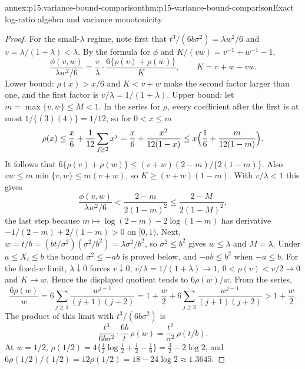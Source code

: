 \begin{annexitem}{annex:p15.variance-bound-comparison}{thm:p15-variance-bound-comparison}{Exact log-ratio algebra and variance monotonicity}
\begin{proof}
For the small-\(\lambda\) regime, note first that
\(t^3/(6b\sigma^2)=\lambda w^2/6\) and \(v=\lambda/(1+\lambda)<\lambda\).
By the formula for \(\phi\) and \(K/(vw)=v^{-1}+w^{-1}-1\),
\[
 \frac{\phi(v,w)}{\lambda w^2/6}
 =\frac v\lambda\cdot\frac{6\{\rho(v)+\rho(w)\}}{K},\qquad
 K=v+w-vw .
\]
Lower bound: \(\rho(x)>x/6\) and \(K<v+w\) make the second factor
larger than one, and the first factor is \(v/\lambda=1/(1+\lambda)\).
Upper bound: let \(m=\max\{v,w\}\leq M<1\). In the series for
\(\rho\), every coefficient after the first is at most
\(1/\{(3)(4)\}=1/12\), so for \(0<x\leq m\)
\[
 \rho(x)\leq\frac x6+\frac1{12}\sum_{j\geq2}x^j
 =\frac x6+\frac{x^2}{12(1-x)}
 \leq x\Bigl(\frac16+\frac m{12(1-m)}\Bigr).
\]
It follows that
\(6\{\rho(v)+\rho(w)\}\leq(v+w)(2-m)/\{2(1-m)\}\). Also
\(vw\leq m\min\{v,w\}\leq m(v+w)\), so \(K\geq(v+w)(1-m)\). With
\(v/\lambda<1\) this gives
\[
 \frac{\phi(v,w)}{\lambda w^2/6}<\frac{2-m}{2(1-m)^2}
 \leq\frac{2-M}{2(1-M)^2},
\]
the last step because \(m\mapsto\log(2-m)-2\log(1-m)\) has derivative
\(-1/(2-m)+2/(1-m)>0\) on \([0,1)\).
Next, \(w=t/b=(bt/\sigma^2)(\sigma^2/b^2)=\lambda\sigma^2/b^2\), so
\(\sigma^2\leq b^2\) gives \(w\leq\lambda\) and \(M=\lambda\). Under
\(a\leq X_i\leq b\) the bound \(\sigma^2\leq-ab\) is proved below, and
\(-ab\leq b^2\) when \(-a\leq b\).
For the fixed-\(w\) limit, \(\lambda\downarrow0\) forces \(v\downarrow0\),
\(v/\lambda=1/(1+\lambda)\to1\), \(0<\rho(v)<v/2\to0\) and \(K\to w\).
Hence the displayed quotient tends to \(6\rho(w)/w\). From the series,
\[
 \frac{6\rho(w)}w=6\sum_{j\geq1}\frac{w^{j-1}}{(j+1)(j+2)}
 =1+\frac w2+6\sum_{j\geq3}\frac{w^{j-1}}{(j+1)(j+2)}>1+\frac w2 .
\]
The product of this limit with \(t^3/(6b\sigma^2)\) is
\[
 \frac{t^3}{6b\sigma^2}\cdot\frac{6b}t\,\rho(w)
 =\frac{t^2}{\sigma^2}\,\rho(t/b).
\]
At \(w=1/2\),
\(\rho(1/2)=4\{\tfrac12\log\tfrac12+\tfrac12-\tfrac18\}=\tfrac32-2\log2\),
and \(6\rho(1/2)/(1/2)=12\rho(1/2)=18-24\log2\approx1.3645\).


\end{proof}
\end{annexitem}
